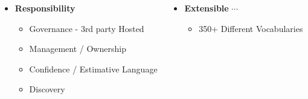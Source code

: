 \begin{frame}
\begin{columns}[T,onlytextwidth]
        \begin{itemize}
            \item \textbf{Responsibility}
            \begin{itemize}
                \item Governance - 3rd party Hosted
                \item Management / Ownership
                \item Confidence / Estimative Language
                \item Discovery
            \end{itemize}
        \end{itemize}

        \vspace{0.5em}

        \begin{itemize}
            \item \textbf{Extensible} $\cdots$
            \begin{itemize}
                \item {350+ Different Vocabularies}
            \end{itemize}
        \end{itemize}

    \end{columns}
\end{frame}


